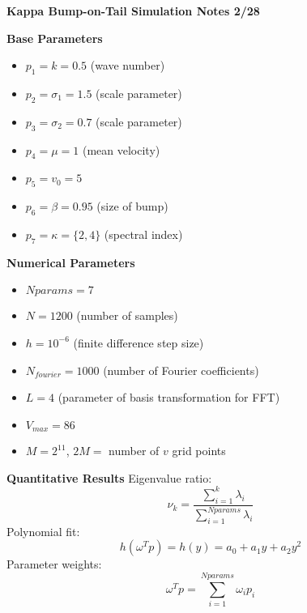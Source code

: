 \documentclass{article}
\begin{document}
\begin{center}
\textbf{\large Kappa Bump-on-Tail Simulation Notes 2/28}
\end{center}

\textbf{\large Base Parameters}
\begin{itemize}
	\item $p_1 = k = 0.5$ (wave number)
	\item $p_2 = \sigma_1 = 1.5$ (scale parameter)
	\item $p_3 = \sigma_2 = 0.7$ (scale parameter)
	\item $p_4 = \mu = 1$ (mean velocity)
	\item $p_5 = v_0 = 5$
	\item $p_6 = \beta = 0.95$ (size of bump)
	\item $p_7 = \kappa = \{2,4\}$ (spectral index)
\end{itemize}

\textbf{\large Numerical Parameters}
\begin{itemize}
	\item $Nparams = 7$
	\item $N = 1200$ (number of samples)
	\item $h=10^{-6}$ (finite difference step size)
	\item $N_{fourier} = 1000$ (number of Fourier coefficients)
	\item $L=4$ (parameter of basis transformation for FFT)
	\item $V_{max} = 86$
	\item $M = 2^{11}$, $2M = $ number of $v$ grid points
\end{itemize}

\textbf{Quantitative Results}
Eigenvalue ratio:
$$\nu_k = \frac{\sum_{i=1}^{k} \lambda_i}{\sum_{i=1}^{Nparams} \lambda_i}$$
Polynomial fit:
$$h(\omega^Tp) = h(y) = a_0 + a_1y + a_2y^2$$
Parameter weights:
$$\omega^Tp = \sum_{i=1}^{Nparams} \omega_i p_i$$
\end{document}

